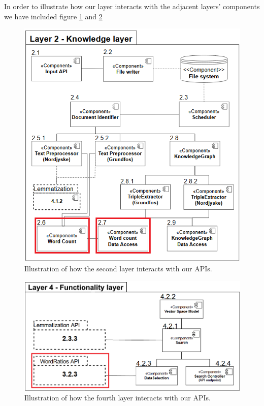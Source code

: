In order to illustrate how our layer interacts with the adjacent layers' components we have included figure \ref{PipelineLayer2} and \ref{PipelineLayer4} 

\begin{figure}[h]
    \centering
    \includegraphics[width=\linewidth]{Images/PipeLineLayer2.png}
    \caption{Illustration of how the second layer interacts with our APIs.}
    \label{PipelineLayer2}
\end{figure}

\begin{figure}[h]
    \centering
    \includegraphics[width=\linewidth]{Images/PipeLineLayer4SE.png}
    \caption{Illustration of how the fourth layer interacts with our APIs.}
    \label{PipelineLayer4}
\end{figure}

